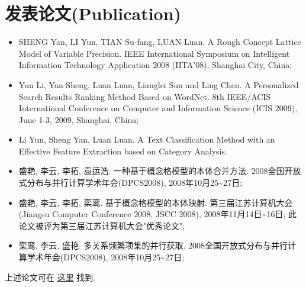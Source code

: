 \documentclass[letterpaper,10pt,english]{manual}
\begin{document}
\section{发表论文(Publication)}
\begin{itemize}
\item {} 
SHENG Yan, LI Yun, TIAN Su-fang, LUAN Luan. A Rough Concept Lattice Model of Variable Precision. IEEE International Symposium on Intelligent Information Technology Application 2008 (IITA'08), Shanghai City, China;

\item {} 
Yun Li, Yan Sheng, Luan Luan, Lianglei Sun and Ling Chen. A Personalized Search Results Ranking Method Based on WordNet. 8th IEEE/ACIS International Conference on Computer and Information Science (ICIS 2009), June 1-3, 2009, Shanghai, China;

\item {} 
Li Yun, Sheng Yan, Luan Luan. A Text Classification Method with an Effective Feature Extraction based on Category Analysis.

\item {} 
盛艳, 李云, 李拓, 袁运浩. 一种基于概念格模型的本体合并方法. 2008全国开放式分布与并行计算学术年会(DPCS2008), 2008年10月25\textasciitilde{}27日;

\item {} 
盛艳, 李云, 李拓, 栾鸾. 基于概念格模型的本体映射. 第三届江苏计算机大会(Jiangsu Computer Conference 2008, JSCC 2008), 2008年11月14日\textasciitilde{}16日; 此论文被评为第三届江苏计算机大会"优秀论文";

\item {} 
栾鸾, 李云, 盛艳. 多关系频繁项集的并行获取. 2008全国开放式分布与并行计算学术年会(DPCS2008), 2008年10月25\textasciitilde{}27日;

\end{itemize}

上述论文可在 \href{http://github.com/lizzie/lizworkspace/tree/cb82ad8d84a1b1a12df80e3508e3629abf09ac83/paper}{这里} 找到.
\end{document}
